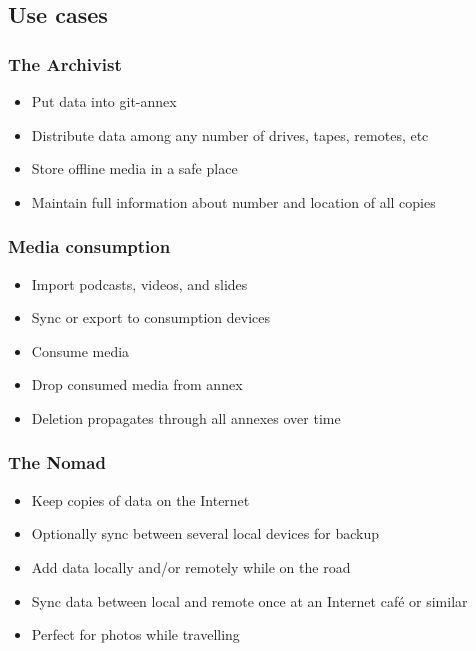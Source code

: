 \documentclass[t]{beamer}
\begin{document}
\subsection{Use cases}

\begin{frame}
	\frametitle{The Archivist}
	\begin{itemize}
		\item Put data into git-annex
		\item Distribute data among any number of drives, tapes, remotes, etc
		\item Store offline media in a safe place
		\item Maintain full information about number and location of all copies
	\end{itemize}
\end{frame}

\begin{frame}
	\frametitle{Media consumption}
	\begin{itemize}
		\item Import podcasts, videos, and slides
		\item Sync or export to consumption devices
		\item Consume media
		\item Drop consumed media from annex
		\item Deletion propagates through all annexes over time
	\end{itemize}
\end{frame}

\begin{frame}
	\frametitle{The Nomad}
	\begin{itemize}
		\item Keep copies of data on the Internet
		\item Optionally sync between several local devices for backup
		\item Add data locally and/or remotely while on the road
		\item Sync data between local and remote once at an Internet café or similar
		\item Perfect for photos while travelling
	\end{itemize}
\end{frame}
\end{document}
